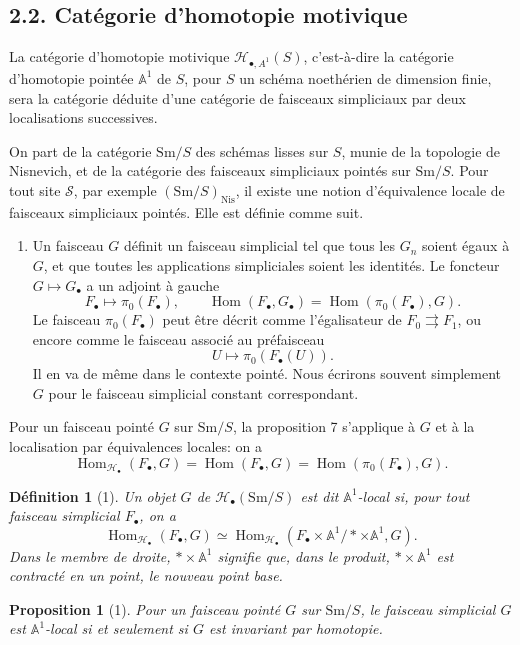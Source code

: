 \documentclass[11pt]{article}
\newcommand{\Aone}{\mathbb A^1}
\newcommand{\Nis}{\mathrm{Nis}}
\newcommand{\Sm}{\mathrm{Sm}}
\newcommand{\Hom}{\operatorname{Hom}}
\newcommand{\Hob}{\mathcal H_\bullet}
\newcommand{\HoA}{\mathcal H_{\bullet,A^1}}
\newcommand{\pt}{*}
\theoremstyle{deligne}
\newtheorem*{proposition*}{Proposition}
\newtheorem*{definition*}{Définition}
\begin{document}
\subsection*{2.2. Catégorie d'homotopie motivique}

La catégorie d'homotopie motivique \(\HoA(S)\), c'est-à-dire la catégorie d'homotopie pointée \(\Aone\) de \(S\), pour \(S\) un schéma noethérien de dimension finie, sera la catégorie déduite d'une catégorie de faisceaux simpliciaux par deux localisations successives.

On part de la catégorie \(\Sm/S\) des schémas lisses sur \(S\), munie de la topologie de Nisnevich, et de la catégorie des faisceaux simpliciaux pointés sur \(\Sm/S\). Pour tout site \(\mathcal S\), par exemple \((\Sm/S)_{\Nis}\), il existe une notion d'équivalence locale de faisceaux simpliciaux pointés. Elle est définie comme suit.
\begin{enumerate}[label=(\alph*)]
\item Un faisceau \(G\) définit un faisceau simplicial tel que tous les \(G_n\) soient égaux à \(G\), et que toutes les applications simpliciales soient les identités. Le foncteur \(G\mapsto G_\bullet\) a un adjoint à gauche
\[
  F_\bullet\longmapsto \pi_0(F_\bullet),
\qquad
  \Hom(F_\bullet,G_\bullet)=\Hom(\pi_0(F_\bullet),G).
\]
Le faisceau \(\pi_0(F_\bullet)\) peut être décrit comme l'égalisateur de \(F_0\rightrightarrows F_1\), ou encore comme le faisceau associé au préfaisceau
\[
  U\longmapsto \pi_0(F_\bullet(U)).
\]
Il en va de même dans le contexte pointé. Nous écrirons souvent simplement \(G\) pour le faisceau simplicial constant correspondant.
\end{enumerate}
Pour un faisceau pointé \(G\) sur \(\Sm/S\), la proposition 7 s'applique à \(G\) et à la localisation par équivalences locales: on a
\[
  \Hom_{\Hob}(F_\bullet,G)=\Hom(F_\bullet,G)=\Hom(\pi_0(F_\bullet),G). \tag{0.1}
\]

\begin{definition*}[1]
Un objet \(G\) de \(\Hob(\Sm/S)\) est dit \(\Aone\)-local si, pour tout faisceau simplicial \(F_\bullet\), on a
\[
  \Hom_{\Hob}(F_\bullet,G)
  \simeq
  \Hom_{\Hob}(F_\bullet\times\Aone/\pt\times\Aone,G).
\]
Dans le membre de droite, \(\pt\times\Aone\) signifie que, dans le produit, \(\pt\times\Aone\) est contracté en un point, le nouveau point base.
\end{definition*}

\begin{proposition*}[1]
Pour un faisceau pointé \(G\) sur \(\Sm/S\), le faisceau simplicial \(G\) est \(\Aone\)-local si et seulement si \(G\) est invariant par homotopie.
\end{proposition*}
\end{document}
